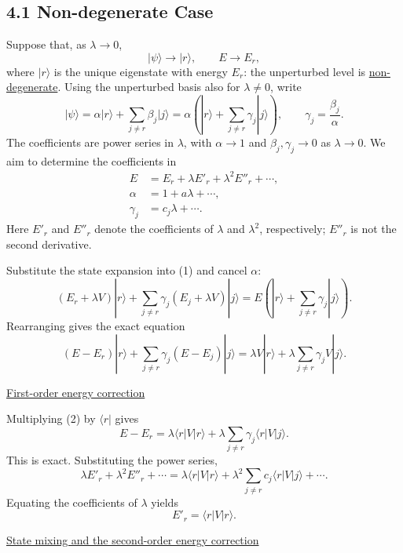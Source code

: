\documentclass[11pt,a4paper]{article}
\begin{document}
\subsection*{4.1 Non-degenerate Case}

Suppose that, as $\lambda\to0$,
\[
    |\psi\rangle\to|r\rangle,
    \qquad E\to E_r,
\]
where $|r\rangle$ is the unique eigenstate with energy $E_r$:
the unperturbed level is \underline{non-degenerate}.
Using the unperturbed basis also for $\lambda\ne0$, write
\[
    |\psi\rangle
      =\alpha|r\rangle+\sum_{j\ne r}\beta_j|j\rangle
      =\alpha\left(|r\rangle+\sum_{j\ne r}\gamma_j|j\rangle\right),
    \qquad \gamma_j=\frac{\beta_j}{\alpha}.
\]
The coefficients are power series in $\lambda$, with $\alpha\to1$
and $\beta_j,\gamma_j\to0$ as $\lambda\to0$. We aim to determine
the coefficients in
\[
    \begin{aligned}
        E&=E_r+\lambda E'_r+\lambda^2 E''_r+\cdots,\\
        \alpha&=1+a\lambda+\cdots,\\
        \gamma_j&=c_j\lambda+\cdots.
    \end{aligned}
\]
Here $E'_r$ and $E''_r$ denote the coefficients of $\lambda$ and
$\lambda^2$, respectively; $E''_r$ is not the second derivative.

Substitute the state expansion into
(1) and cancel $\alpha$:
\[
    (E_r+\lambda V)|r\rangle
      +\sum_{j\ne r}\gamma_j(E_j+\lambda V)|j\rangle
    =E\left(|r\rangle+\sum_{j\ne r}\gamma_j|j\rangle\right).
\]
Rearranging gives the exact equation
\begin{equation}
    (E-E_r)|r\rangle+\sum_{j\ne r}\gamma_j(E-E_j)|j\rangle
      =\lambda V|r\rangle
        +\lambda\sum_{j\ne r}\gamma_j V|j\rangle.
    \tag{2}
\end{equation}

\medskip
\noindent
\underline{First-order energy correction}

Multiplying (2) by $\langle r|$ gives
\[
    E-E_r=\lambda\langle r|V|r\rangle
       +\lambda\sum_{j\ne r}\gamma_j\langle r|V|j\rangle.
\]
This is exact. Substituting the power series,
\[
    \lambda E'_r+\lambda^2E''_r+\cdots
      =\lambda\langle r|V|r\rangle
       +\lambda^2\sum_{j\ne r}c_j\langle r|V|j\rangle+\cdots.
\]
Equating the coefficients of $\lambda$ yields
\[
    \boxed{E'_r=\langle r|V|r\rangle.}
\]

\medskip
\noindent
\underline{State mixing and the second-order energy correction}
\end{document}
